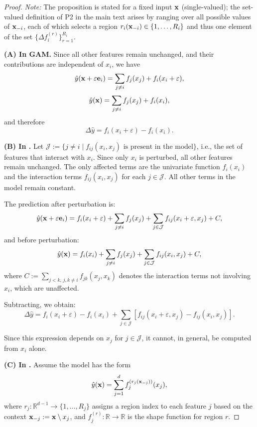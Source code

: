 \begin{proof}

\textit{Note:} The proposition is stated for a fixed input $\mathbf{x}$ (single-valued); the set-valued definition of P2 in the main text arises by ranging over all possible values of $\mathbf{x}_{-i}$, each of which selects a region $r_i(\mathbf{x}_{-i}) \in \{1, \dots, R_i\}$ and thus one element of the set $\{\Delta f_i^{(r)}\}_{r=1}^{R_i}$.

\textbf{(A) In GAM.}
Since all other features remain unchanged, and their contributions are independent of \( x_i \), we have
\[
\hat{y}(\mathbf{x} + \varepsilon \mathbf{e}_i) = \sum_{j \neq i} f_j(x_j) + f_i(x_i + \varepsilon),
\]
\[
\hat{y}(\mathbf{x}) = \sum_{j \neq i} f_j(x_j) + f_i(x_i),
\]
and therefore
\[
\Delta \hat{y} = f_i(x_i + \varepsilon) - f_i(x_i). 
\]

\textbf{(B) In \gamm.}
Let \( \mathcal{J} := \{ j \ne i \mid f_{ij}(x_i, x_j) \text{ is present in the model} \} \), i.e., the set of features that interact with \( x_i \). Since only \( x_i \) is perturbed, all other features remain unchanged. The only affected terms are the univariate function \( f_i(x_i) \) and the interaction terms \( f_{ij}(x_i, x_j) \) for each \( j \in \mathcal{J} \). All other terms in the model remain constant.

The prediction after perturbation is:
\[
\hat{y}(\mathbf{x} + \varepsilon \mathbf{e}_i) = f_i(x_i + \varepsilon) + \sum_{j \ne i} f_j(x_j) + \sum_{j \in \mathcal{J}} f_{ij}(x_i + \varepsilon, x_j) + C,
\]
and before perturbation:
\[
\hat{y}(\mathbf{x}) = f_i(x_i) + \sum_{j \ne i} f_j(x_j) + \sum_{j \in \mathcal{J}} f_{ij}(x_i, x_j) + C,
\]
where \( C := \sum_{j<k,\, j,k \ne i} f_{jk}(x_j, x_k) \) denotes the interaction terms not involving \( x_i \), which are unaffected.

Subtracting, we obtain:
\[
\Delta \hat{y} = f_i(x_i + \varepsilon) - f_i(x_i) + \sum_{j \in \mathcal{J}} \left[ f_{ij}(x_i + \varepsilon, x_j) - f_{ij}(x_i, x_j) \right].
\]

Since this expression depends on \( x_j \) for \( j \in \mathcal{J} \), it cannot, in general, be computed from \( x_i \) alone. 

\textbf{(C) In \method{}.}
Assume the model has the form
\[
\hat{y}(\mathbf{x}) = \sum_{j=1}^d f_j^{(r_j(\mathbf{x}_{-j}))}(x_j),
\]
where \( r_j : \mathbb{R}^{d-1} \to \{1, \dots, R_j\} \) assigns a region index to each feature \( j \) based on the context \( \mathbf{x}_{-j} := \mathbf{x} \setminus x_j \), and \( f_j^{(r)} : \mathbb{R} \to \mathbb{R} \) is the shape function for region \( r \).


\end{proof}

